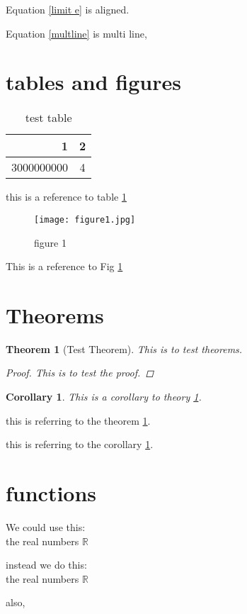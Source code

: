 \documentclass{article}
\numberwithin{table}{section}
\numberwithin{equation}{section}
\numberwithin{figure}{section}
\newtheorem{theorem}{Theorem}
\numberwithin{theorem}{section}
\newtheorem{corollary}{Corollary}[theorem]
\begin{document}
Equation \ref{limit e} is aligned.

Equation \ref{multline} is multi line,

\section{tables and figures}

\begin{table}[h] 
    \centering
    \begin{tabular}{|r|c|}
    \hline
       1  &  2\\    
       \hline
       3000000000  &  4\\
    \hline
    \end{tabular}
    \caption{test table}
    \label{table1}
\end{table}

this is a reference to table \ref{table1}


\begin{figure}[]
    \centering
    \texttt{[image: figure1.jpg]}
    \caption{figure 1}
    \label{figure1}
\end{figure}

This is a reference to Fig \ref{figure1}

\section{Theorems}

\begin{theorem}[Test Theorem]
\label{testtheorem}
This is to test theorems.
\begin{proof}
This is to test the proof.
\end{proof}
\end{theorem}

\begin{corollary}
This is a corollary to theory \ref{testtheorem}.
\label{testcorollary}
\end{corollary}


this is referring to the theorem \ref{testtheorem}.

this is referring to the corollary \ref{testcorollary}.

\section{functions}

We could use this:\\
the real numbers $\mathbb{R}$

instead we do this:\\
\newcommand{\R}{\mathbb{R}}
the real numbers $\R$

also,\\
\newcommand{\cv}[2]{\begin{bmatrix}
#1\\
#2\\
\end{bmatrix}}
\end{document}
